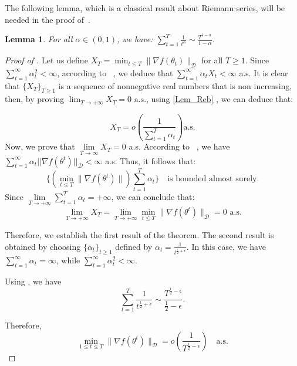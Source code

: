 \documentclass{article} %
\newtheorem{lemma}{Lemma}
\begin{document}
The following lemma, which is a classical result about Riemann series, will be needed in the proof of~.
\begin{lemma}\label{Lemma8}
    For all $\alpha \in (0,1)$, we have: $\sum_{t=1}^T \frac{1}{t^\alpha}\sim \frac{T^{1-\alpha}}{1-\alpha}$. 
\end{lemma}
\begin{proof}[Proof of ]
Let us define \( X_T = \min_{t \le T} \|\nabla f(\theta_t) \|_{\mathcal{D}} \) for all \( T \geq 1 \). Since $\sum_{t= 1}^{\infty} \alpha_t^2<\infty $, according to ~, we deduce that \( \sum_{t=1}^{\infty} \alpha_t X_t < \infty \) a.s. It is clear that $\{X_T\}_{T \ge 1}$ is a sequence of nonnegative real numbers that is non increasing, then, by proving $\lim_{T \to +\infty} X_T =0 \text{ a.s.}$, using \cref{Lem_Reb} , we can deduce that:

\[
X_T = o\left(\frac{1}{\sum_{t=1}^{T} \alpha_t}\right) \text{a.s.} 
\]
Now, we prove that \( \lim\limits_{T \to \infty} X_T = 0 \) a.s. According to ~, we have \( \sum_{t=1}^{\infty} \alpha_t ||\nabla f(\theta^t)||_{\mathcal{D}} < \infty \) a.s. Thus, it follows that:
\[
\{ (\min_{t \leq T} \|\nabla f(\theta^t)\|) \sum_{t=1}^T \alpha_t\}  \quad \text{is bounded almost surely}.
\]
Since $\lim\limits_{T \to +\infty} \sum_{t=1}^T \alpha_t = +\infty$, we can conclude that:
\[
\lim_{T \to +\infty} X_T = \lim_{T \to +\infty} \min_{t \leq T} \|\nabla f(\theta^t)\|_{\mathcal{D}} = 0 \text{ 
 a.s.} 
\]

Therefore, we establish the first result of the theorem. The second result is obtained by choosing \( \{\alpha_t\}_{t \ge 1} \) defined by \( \alpha_t = \frac{1}{t^{\frac{1}{2} + \epsilon}} \). In this case, we have \( \sum_{t=1}^{\infty} \alpha_t = \infty \), while \( \sum_{t=1}^{\infty} \alpha_t^2 <\infty\).


Using , we have \[
\sum_{t=1}^{T} \frac{1}{t^{\frac{1}{2}+\epsilon}} \sim  \frac{T^{\frac{1}{2}-\epsilon}}{\frac{1}{2}-\epsilon} .
\]

Therefore, \[
\min_{1 \leq t \leq T} \lVert \nabla f(\theta^t) \rVert_{\mathcal{D}} = o\left(\frac{1}{T^{\frac{1}{2} - \epsilon}}\right) \quad \text{a.s.} 
\]
\end{proof}
\end{document}
